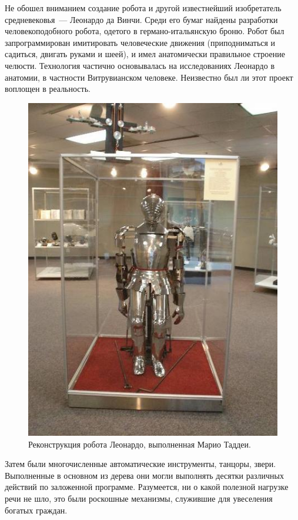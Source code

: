 Не обошел вниманием создание робота и другой известнейший изобретатель средневековья~--- Леонардо да Винчи. Среди его бумаг найдены разработки человекоподобного робота, одетого в германо-итальянскую броню. Робот был запрограммирован имитировать человеческие движения (приподниматься и садиться, двигать руками и шеей), и имел анатомически правильное строение челюсти. Технология частично основывалась на исследованиях Леонардо в анатомии, в частности Витрувианском человеке. Неизвестно был ли этот проект воплощен в реальность.
\clearpage
\begin{figure}[h!]
	\begin{center}
		\includegraphics[width=1\linewidth]{chapters/chapter1/images/2}
		\caption{Реконструкция робота Леонардо, выполненная Марио Таддеи.}
		\label{ris:image1x2}
	\end{center}
\end{figure}

Затем были многочисленные автоматические инструменты, танцоры, звери. Выполненные в основном из дерева они могли выполнять десятки различных действий по заложенной программе. Разумеется, ни о какой полезной нагрузке речи не шло, это были  роскошные механизмы, служившие для увеселения богатых граждан.

